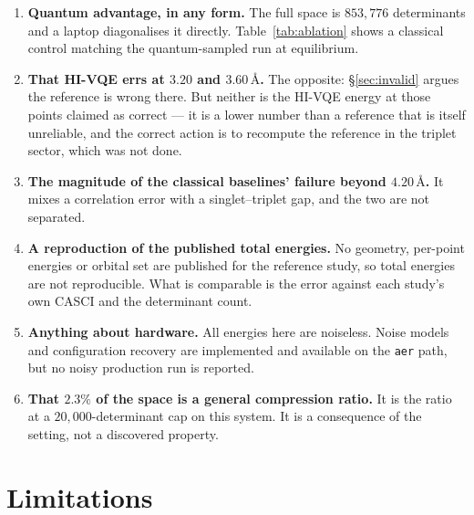 \documentclass[11pt,a4paper]{article}
\newcommand{\Ang}{\ensuremath{\,\text{\AA}}}
\newcommand{\code}[1]{\texttt{\small #1}}
\begin{document}
\begin{enumerate}[leftmargin=1.4em,itemsep=0.3em]

\item \textbf{Quantum advantage, in any form.} The full space is $853{,}776$
  determinants and a laptop diagonalises it directly. Table~\ref{tab:ablation}
  shows a classical control matching the quantum-sampled run at equilibrium.

\item \textbf{That HI-VQE errs at $3.20$ and $3.60\Ang$.} The opposite:
  \S\ref{sec:invalid} argues the reference is wrong there. But neither is the
  HI-VQE energy at those points claimed as correct --- it is a lower number
  than a reference that is itself unreliable, and the correct action is to
  recompute the reference in the triplet sector, which was not done.

\item \textbf{The magnitude of the classical baselines' failure beyond
  $4.20\Ang$.} It mixes a correlation error with a singlet--triplet gap, and the
  two are not separated.

\item \textbf{A reproduction of the published total energies.} No geometry,
  per-point energies or orbital set are published for the reference study, so
  total energies are not reproducible. What is comparable is the error against
  each study's own CASCI and the determinant count.

\item \textbf{Anything about hardware.} All energies here are noiseless. Noise
  models and configuration recovery are implemented and available on the
  \code{aer} path, but no noisy production run is reported.

\item \textbf{That $2.3\%$ of the space is a general compression ratio.} It is
  the ratio at a $20{,}000$-determinant cap on this system. It is a consequence
  of the setting, not a discovered property.

\end{enumerate}

\section{Limitations}
\end{document}
